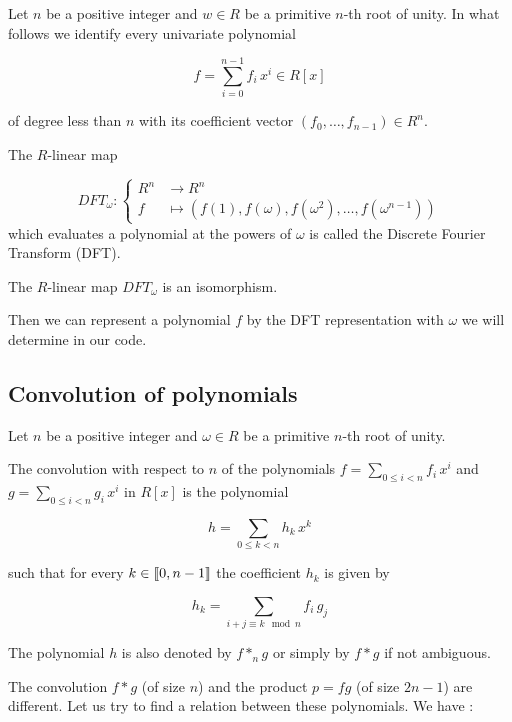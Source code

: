 Let $n$ be a positive integer and $w\in R$ be a primitive $n$-th root of unity. In what follows we identify every univariate polynomial

$$f = \sum_{i=0}^{n-1} f_i\,x^i \in R[x]$$

of degree less than $n$ with its coefficient vector $(f_0,\dots,f_{n-1}) \in R^n$.

\begin{definition*}
The $R$-linear map 

$$DFT_{\omega} : \begin{cases}
R^n &\rightarrow R^n \\
f &\mapsto (f(1), f(\omega), f(\omega^{2}),\dots,f(\omega^{n-1}))
\end{cases}$$
which evaluates a polynomial at the powers of $\omega$ is called the Discrete Fourier Transform (DFT).
\end{definition*}

\begin{proposition*}
The $R$-linear map $DFT_{\omega}$ is an isomorphism.
\end{proposition*}

Then we can represent a polynomial $f$ by the DFT representation with $\omega$ we will determine in our code.

\subsection{Convolution of polynomials}
Let $n$ be a positive integer and $\omega \in R$ be a primitive $n$-th root of unity.\\

\begin{definition*}
The convolution with respect to $n$ of the polynomials $f = \sum_{0\leq i < n} f_i\,x^i$ and $g = \sum_{0\leq i < n} g_i\,x^i$ in $R[x]$ is the polynomial

$$h = \sum_{0\leq k < n}h_k\, x^k$$

such that for every $k \in \mbox{\textlbrackdbl} 0, n-1\mbox{\textrbrackdbl}$ the coefficient $h_k$ is given by

$$h_k = \sum_{i+j\equiv k \mod n}f_i\,g_j$$

The polynomial $h$ is also denoted by $f *_{n} g$ or simply by $f * g$ if not ambiguous.
\end{definition*}

The convolution $f * g$ (of size $n$) and the product $p = fg$ (of size $2n-1$) are different. Let us try to find a relation between these polynomials. We have : \\

